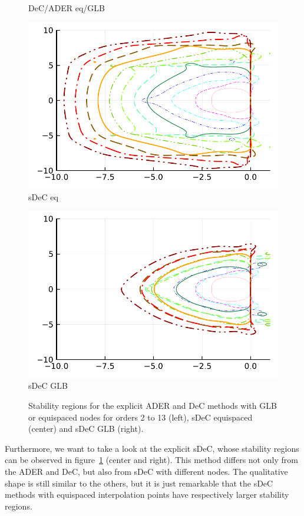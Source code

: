\begin{figure}
\begin{minipage}[t]{0.32\textwidth}
		DeC/ADER eq/GLB
	\end{minipage}
	\begin{minipage}[t]{0.32\textwidth}
		\centering
		\includegraphics[width=\textwidth]{pdf/odepics/sDeC_eq_ord13.pdf}\\
		sDeC eq
	\end{minipage}
	\begin{minipage}[t]{0.32\textwidth}
		\centering
		\includegraphics[width=\textwidth]{pdf/odepics/sDeC_GLB_ord13.pdf}\\
		sDeC GLB
	\end{minipage}
	\caption{Stability regions for the explicit ADER and DeC methods with GLB or equispaced nodes for orders 2 to 13 (left), sDeC equispaced (center) and sDeC GLB (right).}
	\label{fig: ODEEX}
\end{figure}

Furthermore, we want to take a look at the explicit sDeC, whose stability regions can be observed in figure~\ref{fig: ODEEX} (center and right). 
This method differs not only from the ADER and DeC, but also from sDeC with different nodes. The qualitative shape is still similar to the others, but it is just remarkable that the sDeC methods with equispaced interpolation points have respectively larger stability regions.
